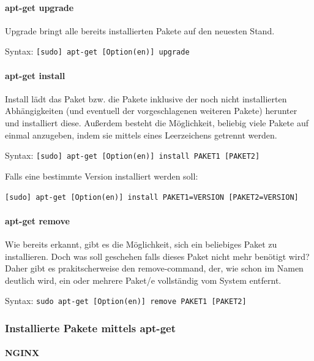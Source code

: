 \hypertarget{apt-get-upgrade}{%
\paragraph{apt-get upgrade}\label{apt-get-upgrade}}

Upgrade bringt alle bereits installierten Pakete auf den neuesten Stand.

Syntax: \texttt{{[}sudo{]}\ apt-get\ {[}Option(en){]}\ upgrade}

\hypertarget{apt-get-install}{%
\paragraph{apt-get install}\label{apt-get-install}}

Install lädt das Paket bzw. die Pakete inklusive der noch nicht
installierten Abhängigkeiten (und eventuell der vorgeschlagenen weiteren
Pakete) herunter und installiert diese. Außerdem besteht die
Möglichkeit, beliebig viele Pakete auf einmal anzugeben, indem sie
mittels eines Leerzeichens getrennt werden.

Syntax:
\texttt{{[}sudo{]}\ apt-get\ {[}Option(en){]}\ install\ PAKET1\ {[}PAKET2{]}}

Falls eine bestimmte Version installiert werden soll:

\texttt{{[}sudo{]}\ apt-get\ {[}Option(en){]}\ install\ PAKET1=VERSION\ {[}PAKET2=VERSION{]}}

\hypertarget{apt-get-remove}{%
\paragraph{apt-get remove}\label{apt-get-remove}}

Wie bereits erkannt, gibt es die Möglichkeit, sich ein beliebiges Paket
zu installieren. Doch was soll geschehen falls dieses Paket nicht mehr
benötigt wird? Daher gibt es prakitscherweise den remove-command, der,
wie schon im Namen deutlich wird, ein oder mehrere Paket/e vollständig
vom System entfernt.

Syntax:
\texttt{sudo\ apt-get\ {[}Option(en){]}\ remove\ PAKET1\ {[}PAKET2{]}}

\hypertarget{installierte-pakete-mittels-apt-get}{%
\subsubsection{Installierte Pakete mittels
apt-get}\label{installierte-pakete-mittels-apt-get}}

\hypertarget{nginx}{%
\paragraph{NGINX}\label{nginx}}

